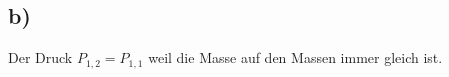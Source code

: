 

\subsection*{b)}

Der Druck \( P_{1,2} = P_{1,1} \) weil die Masse auf den Massen immer gleich ist.